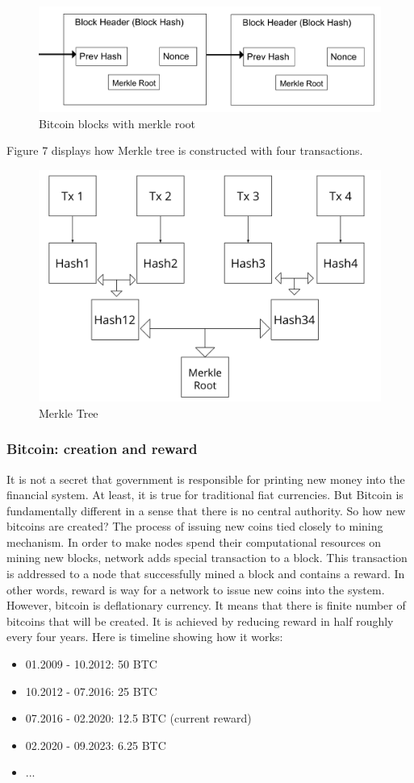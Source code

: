 \documentclass[conference,compsoc]{IEEEtran}
\begin{document}
\begin{figure}[h]
  \centering
  \includegraphics[width=.45\textwidth]{graphics/blocks_merkle.png}
  \caption{Bitcoin blocks with merkle root}
  \label{fig:fig6}
\end{figure}

Figure 7 displays how Merkle tree is constructed with four transactions.

\begin{figure}[h]
  \centering
  \includegraphics[width=.45\textwidth]{graphics/merkle.png}
  \caption{Merkle Tree}
  \label{fig:fig7}
\end{figure}

\subsubsection{Bitcoin: creation and reward}
It is not a secret that government is responsible for printing new money into the financial system. 
At least, it is true for traditional fiat currencies.
But Bitcoin is fundamentally different in a sense that there is no central authority.
So how new bitcoins are created?
The process of issuing new coins tied closely to mining mechanism. 
In order to make nodes spend their computational resources on mining new blocks, network adds special transaction to a block. 
This transaction is addressed to a node that successfully mined a block and contains a reward. 
In other words, reward is way for a network to issue new coins into the system. 
However, bitcoin is deflationary currency. 
It means that there is finite number of bitcoins that will be created. 
It is achieved by reducing reward in half roughly every four years. 
Here is timeline showing how it works:

\begin{itemize}
    \item 01.2009 - 10.2012: 50 BTC
    \item 10.2012 - 07.2016: 25 BTC
    \item 07.2016 - 02.2020: 12.5 BTC (current reward)
    \item 02.2020 - 09.2023: 6.25 BTC
    \item ...
\end{itemize}
\end{document}
